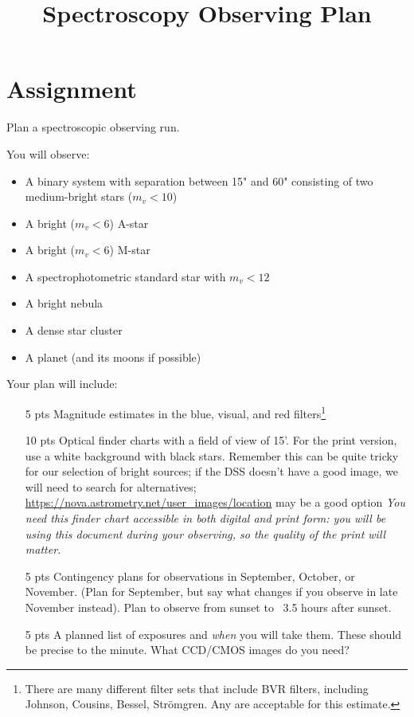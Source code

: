 \documentclass[11pt]{article}
\begin{document}
\title{Spectroscopy Observing Plan}


\section{Assignment}
Plan a spectroscopic observing run.  

 

You will observe:

\begin{itemize}
 \item A binary system with separation between 15" and 60" consisting of two medium-bright stars ($m_v < 10$)
 \item A bright ($m_v < 6$) A-star
 \item A bright ($m_v < 6$) M-star
 \item A spectrophotometric standard star with $m_v < 12$
 \item A bright nebula
 \item A dense star cluster
 \item A planet (and its moons if possible)
\end{itemize}
 

Your plan will include:

\begin{itemize}
    \item [5 pts] Magnitude estimates in the blue, visual, and red
        filters\footnote{There are many different filter sets that include BVR
        filters, including Johnson, Cousins, Bessel, Strömgren.  Any are
        acceptable for this estimate.}
    \item [10 pts] Optical finder charts with a field of view of 15'.
        For the print version, use a white background with black stars.
         Remember this can be quite tricky for our selection of bright
        sources; if the DSS doesn't have a good image, we will need to search
        for alternatives;
        \url{https://nova.astrometry.net/user_images/location}  may be a good option
        \emph{You need this finder chart accessible in both digital and print form:
        you will be using this document during your observing, so the quality of the 
        print will matter.}
    \item [5 pts] Contingency plans for observations in September, October, or
        November.  (Plan for September, but say what changes if you observe in
        late November instead).  Plan to observe from sunset to ~3.5 hours
        after sunset.
    \item [5 pts] A planned list of exposures and \emph{when} you will take them.
        These should be precise to the minute.  What CCD/CMOS images do you
        need?
\end{itemize}
 
\end{document}
